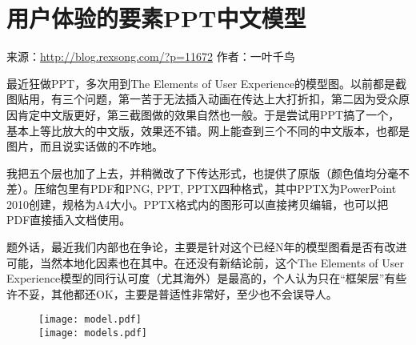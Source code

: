 \chapter{用户体验的要素PPT中文模型}

\begin{center}
来源：\url{http://blog.rexsong.com/?p=11672}
作者：一叶千鸟\cite{The_Elements_of_User_Experience_cn}
\end{center}

最近狂做PPT，多次用到The Elements of User Experience的模型图。以前都是截图贴用，有三个问题，第一苦于无法插入动画在传达上大打折扣，第二因为受众原因肯定中文版更好，第三截图做的效果自然也一般。于是尝试用PPT搞了一个，基本上等比放大的中文版，效果还不错。网上能查到三个不同的中文版本，也都是图片，而且说实话做的不咋地。

我把五个层也加了上去，并稍微改了下传达形式，也提供了原版（颜色值均分毫不差）。压缩包里有PDF和PNG, PPT, PPTX四种格式，其中PPTX为PowerPoint 2010创建，规格为A4大小。PPTX格式内的图形可以直接拷贝编辑，也可以把PDF直接插入文档使用。

题外话，最近我们内部也在争论，主要是针对这个已经N年的模型图看是否有改进可能，当然本地化因素也在其中。在还没有新结论前，这个The Elements of User Experience模型的同行认可度（尤其海外）是最高的，个人认为只在“框架层”有些许不妥，其他都还OK，主要是普适性非常好，至少也不会误导人。


\clearpage

\begin{figure}
\centering
\texttt{[image: model.pdf]}\\
\texttt{[image: models.pdf]}
\end{figure}





